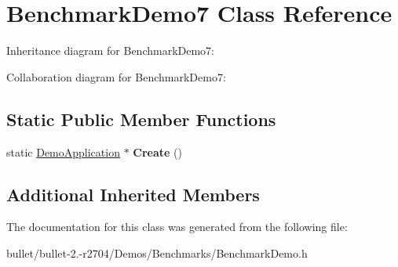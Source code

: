 \hypertarget{class_benchmark_demo7}{\section{Benchmark\+Demo7 Class Reference}
\label{class_benchmark_demo7}
}


Inheritance diagram for Benchmark\+Demo7\+:


Collaboration diagram for Benchmark\+Demo7\+:
\subsection*{Static Public Member Functions}
\begin{DoxyCompactItemize}
\item 
\hypertarget{class_benchmark_demo7_a2dc5140569bc1e87012aa2462ea0ea13}{static \hyperlink{class_demo_application}{Demo\+Application} $\ast$ {\bfseries Create} ()}\label{class_benchmark_demo7_a2dc5140569bc1e87012aa2462ea0ea13}

\end{DoxyCompactItemize}
\subsection*{Additional Inherited Members}


The documentation for this class was generated from the following file\+:\begin{DoxyCompactItemize}
\item 
bullet/bullet-\/2.-\/r2704/\+Demos/\+Benchmarks/Benchmark\+Demo.\+h\end{DoxyCompactItemize}
